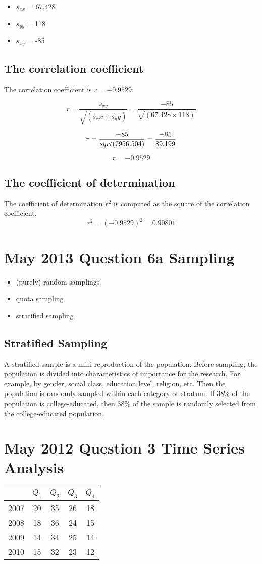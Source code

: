 \documentclass[a4paper,12pt]{article}
\begin{document}
\begin{itemize}
\item $s_{xx}$ = 67.428
\item $s_{yy}$ = 118
\item $s_{xy}$ = -85
\end{itemize}
\subsection*{The correlation coefficient}
The correlation coefficient is $r = -0.9529$.

\[ r = \frac{s_{xy}}{\sqrt{(s_xx \times s_yy)}}= \frac{-85}{\sqrt{(67.428 \times 118)}}\]

\[r= \frac{-85}{sqrt{(7956.504)}} =  {-85 \over 89.199}  \]

\[r = -0.9529\]

\subsection*{The coefficient of determination}
The coefficient of determination $r^2$ is computed as the square of the correlation coefficient.
\[r^2 = (-0.9529)^2 = 0.90801\]
\section*{May 2013 Question 6a Sampling }

\begin{itemize}
	\item (purely) random samplings
	\item quota sampling
	\item stratified sampling
\end{itemize}

\subsection*{Stratified Sampling}
A stratified sample is a mini-reproduction of the population. Before sampling, the population is divided into characteristics of importance for the research. For example, by gender, social class, education level, religion, etc. Then the population is randomly sampled within each category or stratum. If 38\% of the population is college-educated, then 38\% of the sample is randomly selected from the college-educated population.
\newpage
\section*{May 2012 Question 3 Time Series Analysis}
\begin{center}
	\begin{tabular}{|c|c|c|c|c|}
		\hline  & $Q_1$ & $Q_2$ & $Q_3$ & $Q_4$ \\
		\hline 2007 & 20 & 35 & 26 & 18 \\  
		\hline 2008 & 18 & 36 & 24& 15 \\ 
		\hline 2009 & 14 & 34 & 25 & 14 \\ 
		\hline 2010 & 15 & 32 & 23 & 12 \\ 
		\hline 
	\end{tabular} 
\end{center}
\end{document}
